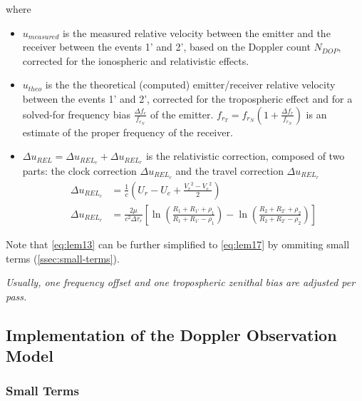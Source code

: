 where 
\begin{itemize}
    \item \(u_{measured}\) is the measured relative velocity between the emitter and 
    the receiver between the events 1' and 2', based on the Doppler count \(N_{DOP}\), 
    corrected for the ionospheric and relativistic effects.

    \item \(u_{theo}\) is the the theoretical (computed) emitter/receiver relative velocity 
    between the events 1' and 2', corrected for the tropospheric effect and for a solved-for 
    frequency bias \(\frac{\Delta f_e}{f_{e_N}}\) of the emitter. \(f_{r_T} = f_{r_N} (1 + \frac{\Delta f_r}{f_{r_N}})\) 
    is an estimate of the proper frequency of the receiver.

    \item \(\Delta u_{REL} = \Delta u_{{REL}_c} + \Delta u_{{REL}_r}\) is the relativistic 
    correction, composed of two parts: the clock correction \(\Delta u_{{REL}_c}\) and the 
    travel correction \(\Delta u_{{REL}_r}\)
    \begin{subequations} \label{eq:lem14}
        \begin{align}
            \Delta u_{{REL}_c} & = \frac{1}{c} 
              (U_r - U_e + \frac{{V_r}^2 - {V_e}^2}{2}) \label{eq:lem14a}\\
            \Delta u_{{REL}_r} & = \frac{2 \mu}{c^2 \Delta\tau_r} \left[ 
              \ln{(\frac{R_1 + R_{1'} + \rho_1}{R_1 + R_{1'} - \rho_1})} - 
              \ln{(\frac{R_2 + R_{2'} + \rho_2}{R_2 + R_{2'} - \rho_2})} \right] \label{eq:lem14b}
        \end{align}
    \end{subequations}
\end{itemize}

Note that \ref{eq:lem13} can be further simplified to \ref{eq:lem17} by 
ommiting small terms (\ref{ssec:small-terms}).

\emph{Usually, one frequency offset and one tropospheric zenithal bias are adjusted per pass.}

\subsection{Implementation of the Doppler Observation Model}

\subsubsection{Small Terms}
\label{sssec:small-terms}


